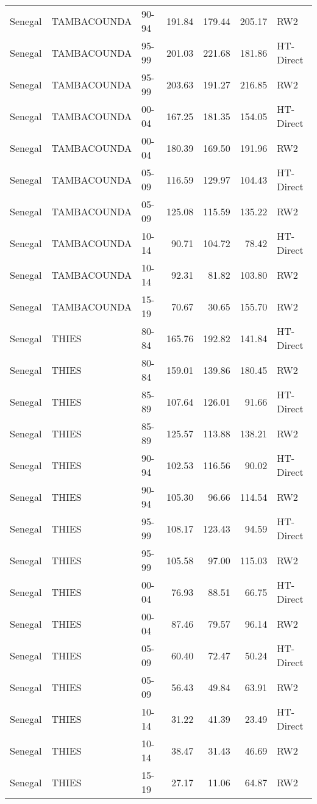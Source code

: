 \begin{longtable}{lllrrrl}
  Senegal & TAMBACOUNDA & 90-94 & 191.84 & 179.44 & 205.17 & RW2 \\ 
  Senegal & TAMBACOUNDA & 95-99 & 201.03 & 221.68 & 181.86 & HT-Direct \\ 
  Senegal & TAMBACOUNDA & 95-99 & 203.63 & 191.27 & 216.85 & RW2 \\ 
  Senegal & TAMBACOUNDA & 00-04 & 167.25 & 181.35 & 154.05 & HT-Direct \\ 
  Senegal & TAMBACOUNDA & 00-04 & 180.39 & 169.50 & 191.96 & RW2 \\ 
  Senegal & TAMBACOUNDA & 05-09 & 116.59 & 129.97 & 104.43 & HT-Direct \\ 
  Senegal & TAMBACOUNDA & 05-09 & 125.08 & 115.59 & 135.22 & RW2 \\ 
  Senegal & TAMBACOUNDA & 10-14 & 90.71 & 104.72 & 78.42 & HT-Direct \\ 
  Senegal & TAMBACOUNDA & 10-14 & 92.31 & 81.82 & 103.80 & RW2 \\ 
  Senegal & TAMBACOUNDA & 15-19 & 70.67 & 30.65 & 155.70 & RW2 \\ 
  Senegal & THIES & 80-84 & 165.76 & 192.82 & 141.84 & HT-Direct \\ 
  Senegal & THIES & 80-84 & 159.01 & 139.86 & 180.45 & RW2 \\ 
  Senegal & THIES & 85-89 & 107.64 & 126.01 & 91.66 & HT-Direct \\ 
  Senegal & THIES & 85-89 & 125.57 & 113.88 & 138.21 & RW2 \\ 
  Senegal & THIES & 90-94 & 102.53 & 116.56 & 90.02 & HT-Direct \\ 
  Senegal & THIES & 90-94 & 105.30 & 96.66 & 114.54 & RW2 \\ 
  Senegal & THIES & 95-99 & 108.17 & 123.43 & 94.59 & HT-Direct \\ 
  Senegal & THIES & 95-99 & 105.58 & 97.00 & 115.03 & RW2 \\ 
  Senegal & THIES & 00-04 & 76.93 & 88.51 & 66.75 & HT-Direct \\ 
  Senegal & THIES & 00-04 & 87.46 & 79.57 & 96.14 & RW2 \\ 
  Senegal & THIES & 05-09 & 60.40 & 72.47 & 50.24 & HT-Direct \\ 
  Senegal & THIES & 05-09 & 56.43 & 49.84 & 63.91 & RW2 \\ 
  Senegal & THIES & 10-14 & 31.22 & 41.39 & 23.49 & HT-Direct \\ 
  Senegal & THIES & 10-14 & 38.47 & 31.43 & 46.69 & RW2 \\ 
  Senegal & THIES & 15-19 & 27.17 & 11.06 & 64.87 & RW2 \\ 

\end{longtable}

